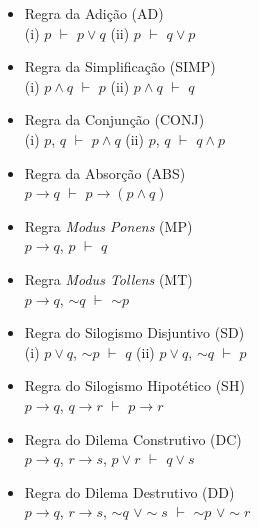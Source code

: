 \documentclass[12pt,a4paper,oneside]{article}
\begin{document}
\begin{itemize}
	\item Regra da Adição (AD) \\
	(i) $p$ $\vdash$ $p\vee q$ \hspace*{0.5cm} (ii) $p$ $\vdash$ $q \vee p$
	\item Regra da Simplificação (SIMP) \\
	(i) $p \wedge q$ $\vdash$ $p$ \hspace*{0.5cm} (ii) $p \wedge q$ $\vdash$ $q$
	\item Regra da Conjunção (CONJ) \\
	(i) $p$, $q$ $\vdash$ $p \wedge q$ \hspace*{0.5cm} (ii) $p$, $q$ $\vdash$ $q \wedge p$
	\item Regra da Absorção (ABS) \\
	$p \rightarrow q$ $\vdash$ $p \rightarrow (p \wedge q)$
	\item Regra {\it Modus Ponens} (MP) \\
	$p \rightarrow q$, $p$ $\vdash$ $q$
	\item Regra {\it Modus Tollens} (MT) \\
	$p \rightarrow q$, $\sim q$ $\vdash$ $\sim p$
	\item Regra do Silogismo Disjuntivo (SD) \\
	(i) $p \vee q$, $\sim p$ $\vdash$ $q$ \hspace*{0.5cm} (ii) $p \vee q$, $\sim q$ $\vdash$ $p$
	\item Regra do Silogismo Hipotético (SH) \\
		$p \rightarrow q$, $q \rightarrow r$ $\vdash$ $p \rightarrow r$
	\item Regra do Dilema Construtivo (DC) \\
		$p \rightarrow q$, $r \rightarrow s$, $p \vee r$ $\vdash$ $q \vee s$
	\item Regra do Dilema Destrutivo (DD) \\
		$p \rightarrow q$, $r \rightarrow s$, $\sim q$ $\vee \sim s$ $\vdash$ $\sim p$ $\vee \sim r$
\end{itemize}
\end{document}
